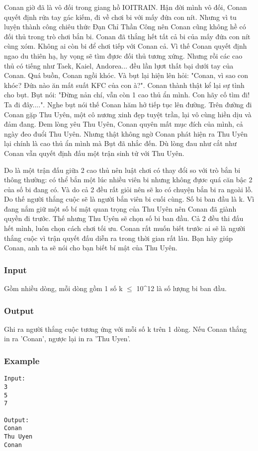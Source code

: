 



   Conan giờ đã là vô đối trong giang hồ IOITRAIN. Hận đời mình vô đối, Conan quyết định rửa tay gác kiếm, đi về chơi bi với mấy đứa con nít. Nhưng vì tu luyện thành công chiêu thức Đạn Chỉ Thần Công nên Conan cũng không hề có đối thủ trong trò chơi bắn bi. Conan đã thắng hết tất cả bi của mấy đứa con nít cùng xóm. Không ai còn bi để chơi tiếp với Conan cả. Vì thế Conan quyết định ngao du thiên hạ, hy vọng sẽ tìm đựơc đối thủ tương xứng. Nhưng rồi các cao thủ có tiếng như Taek, Kaiel, Andorea... đều lần lựơt thất bại dưới tay của Conan. Quá buồn, Conan ngồi khóc. Và bụt lại hiện lên hỏi: "Conan, vì sao con khóc? Đứa nào ăn mất suất KFC của con à?". Conan thành thật kể lại sự tình cho bụt. Bụt nói: "Đừng nản chí, vẫn còn 1 cao thủ ẩn mình. Con hãy cố tìm đi! Ta đi đây....". Nghe bụt nói thế Conan hăm hở tiếp tục lên đường. Trên đường đi Conan gặp Thu Uyên, một cô nương xinh đẹp tuyệt trần, lại vô cùng hiền dịu và đảm đang. Đem lòng yêu Thu Uyên, Conan quyên mất mục đích của mình, cả ngày đeo đuổi Thu Uyên. Nhưng thật không ngờ Conan phát hiện ra Thu Uyên lại chính là cao thủ ẩn mình mà Bụt đã nhắc đến. Dù lòng đau như cắt như Conan vẫn quyết định đấu một trận sinh tử với Thu Uyên.  

   Do là một trận đấu giữa 2 cao thủ nên luật chơi có thay đổi so với trò bắn bi thông thường: có thể bắn một lúc nhiều viên bi nhưng không đựơc quá căn bậc 2 của số bi đang có. Và do cả 2 đều rất giỏi nên sẽ ko có chuyện bắn bi ra ngoài lỗ. Do thế người thắng cuộc sẽ là người bắn viên bi cuối cùng. Số bi ban đầu là k. Vì đang nắm giữ một số bí mật quan trọng của Thu Uyên nên Conan đã giành quyền đi trước. Thế nhưng Thu Uyên sẽ chọn số bi ban đầu. Cả 2 đều thi đấu hết mình, luôn chọn cách chơi tối ưu. Conan rất muốn biết trước ai sẽ là người thắng cuộc vì trận quyết đấu diễn ra trong thời gian rất lâu. Bạn hãy giúp Conan, anh ta sẽ nói cho bạn biết bí mật của Thu Uyên.  

\subsubsection{   Input  }

   Gồm nhiều dòng, mỗi dòng gồm 1 số k  $\le$  10\textasciicircum12 là số lượng bi ban đầu.  

\subsubsection{   Output  }

   Ghi ra người thắng cuộc tương ứng với mỗi số k trên 1 dòng. Nếu Conan thắng in ra 'Conan', ngược lại in ra 'Thu Uyen'.  

\subsubsection{   Example  }
\begin{verbatim}
Input:
3 
5
7

Output:
Conan
Thu Uyen
Conan
\end{verbatim}
